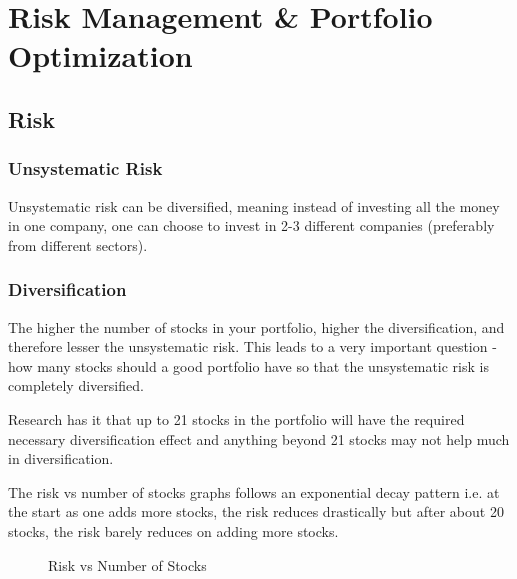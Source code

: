 \chapter{Risk Management \& Portfolio Optimization}

\section{Risk}
\subsection{Unsystematic Risk}

Unsystematic risk can be diversified, meaning instead of investing all the money in one company, one can choose to invest in 2-3 different companies (preferably from different sectors).

\subsection{Diversification}


The higher the number of stocks in your portfolio, higher the diversification, and therefore lesser the unsystematic risk.
This leads to a very important question - how many stocks should a good portfolio have so that the unsystematic risk is completely diversified.

Research has it that up to 21 stocks in the portfolio will have the required necessary diversification effect and anything beyond 21 stocks may not help much in diversification.

\newpage

The risk vs number of stocks graphs follows an exponential decay pattern i.e. at the start as one adds more stocks, the risk reduces drastically but after about 20 stocks, the risk barely reduces on adding more stocks.

\begin{figure}[h]
  \centering
  \caption{Risk vs Number of Stocks}
\end{figure}

